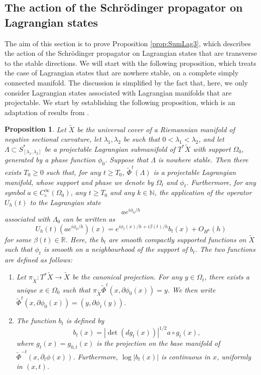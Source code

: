\documentclass[JEP,XML,SOM,Unicode,published]{cedram}
\newcommand{\rc}{\mathrm{c}}
\theoremstyle{plain}
\newtheorem{proposition}[theorem]{Proposition}
\theoremstyle{definition}
\newcommand{\N}{\mathbb{N}}
\newcommand{\R}{\mathbb{R}}
\begin{document}
\subsection{The action of the Schrödinger propagator on Lagrangian states}\label{ss:demo_propagation}
The aim of this section is to prove Proposition \ref{prop:SumLag3}, which describes the action of the Schrödinger propagator on Lagrangian states that are transverse to the stable directions. We will start with the following proposition, which treats the case of Lagrangian states that are nowhere stable, on a complete simply connected manifold. The discussion is simplified by the fact that, here, we only consider Lagrangian states associated with Lagrangian manifolds that are projectable. We start by establishing the following proposition, which is an adaptation of results from \cite[\S 4.1]{NZ}.
\begin{proposition}\label{cor:SchrodHadam}
Let $\widetilde{X}$ be the universal cover of a Riemannian manifold of negative sectional curvature, let $\lambda_1,\lambda_2$ be such that $0<\lambda_1<\lambda_2$, and
let $\Lambda \subset S^*_{[\lambda_1,\lambda_2]}$ be a projectable Lagrangian submanifold of $T^*\widetilde{X}$ with support $\Omega_0$, generated by a phase function $\phi_0$. Suppose that $\Lambda$ is nowhere stable. Then there exists $T_0\geq 0$ such that, for any $t\geq T_0$, $\widetilde{\Phi}^t(\Lambda)$ is a projectable Lagrangian manifold, whose support and phase we denote by $\Omega_t$ and $\phi_t$. Furthermore, for any symbol $a\in C_\rc^\infty(\Omega_0)$, any $t\geq T_0$ and any $k\in \N$, the application of the operator $U_h(t)$ to the Lagrangian state
\begin{equation*}
a e^{i\phi_0/h}
\end{equation*}
associated with $\Lambda_0$ can be written as
\begin{equation*}
U_h(t) (a e^{i\phi_0/h})(x) = e^{i\phi_{t}(x)/h+i\beta(t)/h} b_{t}(x) +O_{H^k}(h)
\end{equation*}
for some $\beta(t)\in \R$. Here, the $b_{t}$ are smooth compactly supported functions on $\widetilde{X}$ such that $\phi_{t}$ is smooth on a neighbourhood of the support of $b_{t}$. The two functions are defined as follows:
\begin{enumerate}
\item Let $\pi_{\widetilde{X}}:T^*\widetilde{X}\to\widetilde{X}$ be the canonical projection. For any $y\in \Omega_t$, there exists a unique $x\in \Omega_0$ such that $\pi_{\widetilde{X}}\widetilde{\Phi}^t(x, \partial \phi_0(x)) =y$. We then write $\widetilde{\Phi}^t(x, \partial \phi_0(x)) = (y, \partial \phi_t(y))$.
\item The function $b_t$ is defined by
\[
b_t(x)=|{\det}(dg_t(x))|^{1/2}a\circ g_t(x),
\]
where $g_t(x)= g_{0,t}(x)$ is the projection on the base manifold of $\widetilde{\Phi}^{-t}(x,\partial_t\phi(x))$. Furthermore, $\log|b_t(x)|$ is continuous in $x$, uniformly in $(x,t)$.
\end{enumerate}
\end{proposition}
\end{document}
